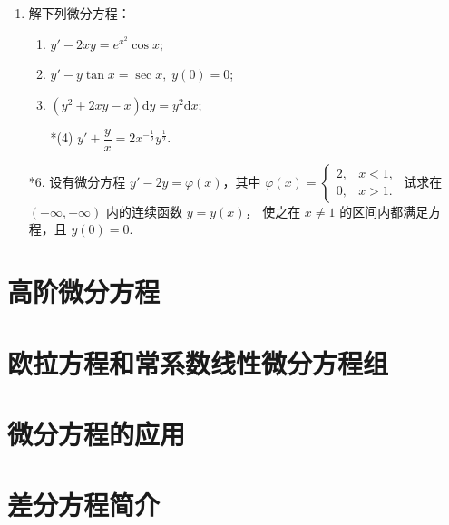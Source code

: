 \begin{enumerate}
    \item 解下列微分方程：
    \begin{enumerate}[(1)]\setlength{\itemsep}{5pt}\setlength{\topsep}{15pt}
        \item $y'-2xy=e^{x^2}\cos x$;
        \item $y'-y\tan x=\sec x,\;y(0)=0$;
        \item $(y^2+2xy-x)\text{d}y=y^2\text{d}x$;
        \item[*(4)] $y'+\dfrac{y}{x}=2x^{-\frac{1}{2}}y^{\frac{1}{2}}$.
    \end{enumerate}

    \item[*6.] 设有微分方程 $y'-2y=\varphi(x)$，其中 $\varphi(x)=\begin{cases}
        2,&x<1,\\
        0,&x>1.
    \end{cases}$ 试求在 $(-\infty,+\infty)$ 内的连续函数 $y=y(x)$，
    使之在 $x\not=1$ 的区间内都满足方程，且 $y(0)=0$.

\end{enumerate}

\section{高阶微分方程}


\section{欧拉方程和常系数线性微分方程组}


\section{微分方程的应用}


\section{差分方程简介}

